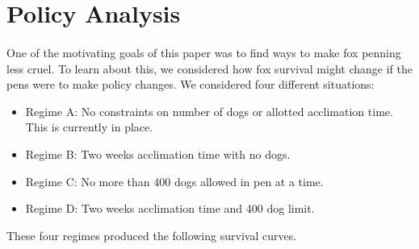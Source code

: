 \documentclass[aoas,preprint]{imsart}
\numberwithin{equation}{section}
\theoremstyle{plain}
\begin{document}
\section{Policy Analysis}

\paragraph{}One of the motivating goals of this paper was to find ways to make fox penning less cruel. To learn about this, we considered how fox survival might change if the pens were to make policy changes. We considered four different situations:

	\begin{itemize}
		\item Regime A: No constraints on number of dogs or allotted acclimation time. This is currently in place.
		\item Regime B: Two weeks acclimation time with no dogs.
		\item Regime C: No more than 400 dogs allowed in pen at a time.
		\item Regime D: Two weeks acclimation time and 400 dog limit.
	\end{itemize}
These four regimes produced the following survival curves.
\end{document}
